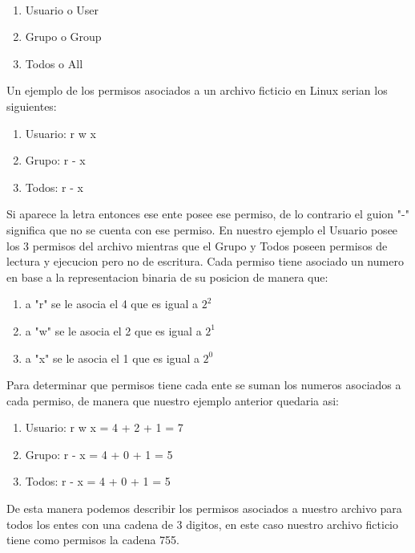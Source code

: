 \documentclass[letterpaper, 12pt, oneside]{article}
\begin{document}
	\\
	\begin{enumerate}
		\item Usuario o User 
		\item Grupo o Group
		\item Todos o All
	\\
	\end{enumerate}
	Un ejemplo de los permisos asociados a un archivo ficticio en Linux serian los siguientes:
	\\
	\begin{enumerate}
		\item Usuario: r w x
		\item Grupo: r - x
		\item Todos: r - x
	\\
	\end{enumerate}
	Si aparece la letra entonces ese ente posee ese permiso, de lo contrario el guion "-" significa que no se cuenta con ese permiso. En nuestro ejemplo el Usuario posee los 3 permisos del archivo mientras que el Grupo y Todos poseen permisos de lectura y ejecucion pero no de escritura. Cada permiso tiene asociado un numero en base a la representacion binaria de su posicion de manera que:
	\\
	\begin{enumerate} 
		\item a "r" se le asocia el 4 que es igual a $2^{2}$
		\item a "w" se le asocia el 2 que es igual a $2^{1}$
		\item a "x" se le asocia el 1 que es igual a $2^{0}$
	\\
	\end{enumerate}
	Para determinar que permisos tiene cada ente se suman los numeros asociados a cada permiso, de manera que nuestro ejemplo anterior quedaria asi:
	\\
	\begin{enumerate}
		\item Usuario: r w x = 4 + 2 + 1 = 7
		\item Grupo: r - x = 4 + 0 + 1 = 5
		\item Todos: r - x = 4 + 0 + 1 = 5
	\\
	\end{enumerate}
	De esta manera podemos describir los permisos asociados a nuestro archivo para todos los entes con una cadena de 3 digitos, en este caso nuestro archivo ficticio tiene como permisos la cadena 755.
	\\
	\\
\end{document}
